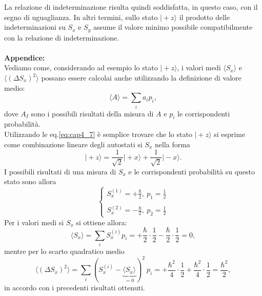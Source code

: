 La relazione di indeterminazione risulta quindi soddisfatta, in questo caso, con il segno di uguaglianza. In altri termini, sullo stato $\vert +z \rangle $ il prodotto delle indeterminazioni su $S_x$ e $S_y$ assume il valore minimo possibile compatibilmente con la relazione di indeterminazione.\\ \\
\textbf{Appendice:}\\
Vediamo come, considerando ad esempio lo stato $\vert + z \rangle $, i valori medi $\langle S_x \rangle $ e $\langle (\Delta S_x)^2 \rangle $ possano essere calcolai anche utilizzando la definizione di valore medio:
\begin{equation}
\langle A \rangle = \sum _i a_i p_i,
\end{equation}
dove $A_I$ sono i possibili risultati della misura di $A$ e $p_i$ le corrispondenti probabilità.\\
Utilizzando le eq.\eqref{eq:cap4_7} è semplice trovare che lo stato $\vert +z \rangle$ si esprime come combinazione lineare degli autostati si $S_x$ nella forma
\begin{equation}
\vert +z \rangle = \frac{1}{\sqrt{2}} \vert +x \rangle + \frac{1}{\sqrt{2}} \vert -x \rangle .
\end{equation}
I possibili risultati di una misura di $S_x$ e le corrispondenti probabilità su questo stato sono allora
\begin{equation}
\begin{cases}
\displaystyle{S_x ^{(1)} = +\frac{\hbar}{2}, \ p_1 = \frac{1}{2}} \\
\\
\displaystyle{S_x ^{(2)} = -\frac{\hbar}{2}, \ p_2 = \frac{1}{2}}
\end{cases}
\end{equation}
Per i valori medi si $S_x$ si ottiene allora:
\begin{equation}
\langle S_x \rangle = \sum _i S_x ^{(i)} p_i= +\frac{\hbar}{2}\cdot\frac{1}{2}-\frac{\hbar}{2}\cdot\frac{1}{2}=0,
\end{equation}
mentre per lo scarto quadratico medio
\begin{equation}
\langle (\Delta S_x)^2 \rangle = \sum _i ( S_x ^{(i)}- \underbrace{\langle S_x \rangle}_{=0}) ^2\ p_i= +\frac{\hbar ^2}{4}\cdot\frac{1}{2}+\frac{\hbar ^2}{4}\cdot\frac{1}{2}= \frac{\hbar ^2}{2},
\end{equation}
in accordo con i precedenti risultati ottenuti.
